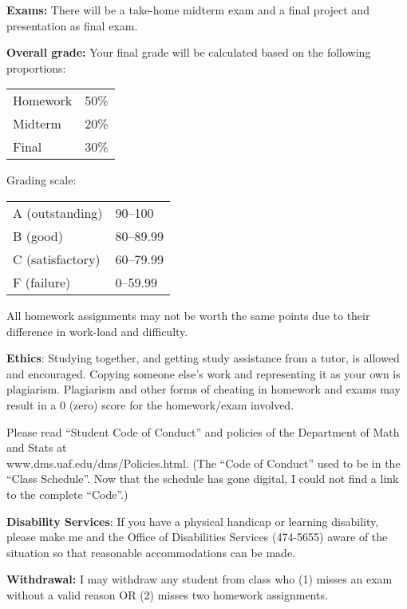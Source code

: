 \documentclass{article}
\begin{document}
\bigskip
\textbf{\large Exams:}
There will be a take-home midterm exam
and a final project and presentation as final exam.

\bigskip
\textbf{\large Overall grade:}
Your final grade will be calculated based on the following proportions:

\hskip2cm
\begin{tabular}{ll}
Homework & 50\%\\
Midterm & 20\%\\
Final & 30\%
\end{tabular}

Grading scale:

\hskip2cm
\begin{tabular}{ll}
A (outstanding) & 90--100\\
B (good)  & 80--89.99\\
C (satisfactory) &  60--79.99\\
F (failure) & 0--59.99
\end{tabular}

All homework assignments may not be worth the same points due to their
difference in work-load and difficulty.

\bigskip
\textbf{\large Ethics}:
Studying together, and getting study assistance from a tutor, is allowed
and encouraged. Copying someone else's work and representing it as your
own is plagiarism. Plagiarism and other forms of cheating in homework
and exams may result in a 0 (zero) score for the homework/exam
involved.

Please read ``Student Code of Conduct''
and policies of the Department of Math and Stats at\\
www.dms.uaf.edu/dms/Policies.html.
(The ``Code of Conduct'' used to be in the ``Class Schedule''.
Now that the schedule has gone digital, I could not find a link to the
complete ``Code''.)


\bigskip
\textbf{\large Disability Services}:
If you have a physical handicap or learning disability, please make me
and the Office of Disabilities Services (474-5655) aware of the
situation so that reasonable accommodations can be made.


\bigskip
\textbf{\large Withdrawal:}
I may withdraw any student from class who
(1) misses an exam without a valid reason OR
(2) misses two homework assignments.
\end{document}
